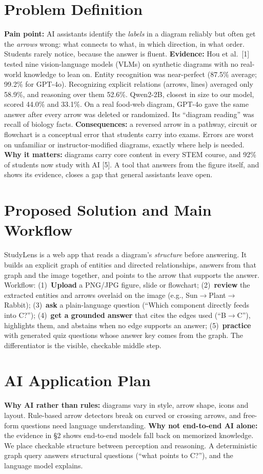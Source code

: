 \documentclass[11pt,letterpaper]{article}
\begin{document}
\section{Problem Definition}
\textbf{Pain point:} AI assistants identify the \emph{labels} in a diagram reliably but often get the \emph{arrows} wrong: what connects to what, in which direction, in what order. Students rarely notice, because the answer is fluent.
\textbf{Evidence:} Hou et al.\ [1] tested nine vision-language models (VLMs) on synthetic diagrams with no real-world knowledge to lean on. Entity recognition was near-perfect (87.5\% average; 99.2\% for GPT-4o). Recognizing explicit relations (arrows, lines) averaged only 58.9\%, and reasoning over them 52.6\%. Qwen2-2B, closest in size to our model, scored 44.0\% and 33.1\%. On a real food-web diagram, GPT-4o gave the same answer after every arrow was deleted or randomized. Its ``diagram reading'' was recall of biology facts.
\textbf{Consequences:} a reversed arrow in a pathway, circuit or flowchart is a conceptual error that students carry into exams. Errors are worst on unfamiliar or instructor-modified diagrams, exactly where help is needed. 
\textbf{Why it matters:} diagrams carry core content in every STEM course, and 92\% of students now study with AI [5]. A tool that answers from the figure itself, and shows its evidence, closes a gap that general assistants leave open.

\section{Proposed Solution and Main Workflow}
StudyLens is a web app that reads a diagram's \emph{structure} before answering. It builds an explicit graph of entities and directed relationships, answers from that graph and the image together, and points to the arrow that supports the answer. Workflow:
(1)~\textbf{Upload} a PNG/JPG figure, slide or flowchart;
(2)~\textbf{review} the extracted entities and arrows overlaid on the image (e.g., Sun$\rightarrow$Plant$\rightarrow$Rabbit);
(3)~\textbf{ask} a plain-language question (``Which component directly feeds into C?'');
(4)~\textbf{get a grounded answer} that cites the edges used (``B$\rightarrow$C''), highlights them, and abstains when no edge supports an answer;
(5)~\textbf{practice} with generated quiz questions whose answer key comes from the graph.
The differentiator is the visible, checkable middle step.

\section{AI Application Plan}
\textbf{Why AI rather than rules:} diagrams vary in style, arrow shape, icons and layout. Rule-based arrow detectors break on curved or crossing arrows, and free-form questions need language understanding.
\textbf{Why not end-to-end AI alone:} the evidence in \S2 shows end-to-end models fall back on memorized knowledge. We place checkable structure between perception and reasoning. A deterministic graph query answers structural questions (``what points to C?''), and the language model explains.
\end{document}
